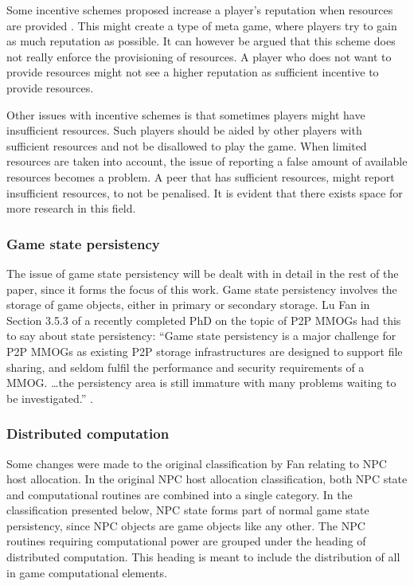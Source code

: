 \documentclass[10pt,a4paper,journal,cspaper,compsoc]{IEEEtran}
\begin{document}
Some incentive schemes proposed increase a player's reputation when resources are provided \cite{classic_p2p_reputation} \cite{proactive_reputation}.
This might create a type of meta game, where players try to gain as much reputation as possible. It can however be argued that this scheme does not
really enforce the provisioning of resources. A player who does not want to provide resources might not see a higher reputation as sufficient
incentive to provide resources.

Other issues with incentive schemes is that sometimes players might have insufficient resources. Such players should be aided by other players with
sufficient resources and not be disallowed to play the game. When limited resources are taken into account, the issue of reporting a false amount of
available resources becomes a problem. A peer that has sufficient resources, might report insufficient resources, to not be penalised. It is evident
that there exists space for more research in this field.

\subsubsection{Game state persistency}

The issue of game state persistency will be dealt with in detail in the rest of the paper, since it forms the focus of this work. Game state
persistency involves the storage of game objects, either in primary or secondary storage. Lu Fan in Section 3.5.3 of a recently completed PhD on the
topic of P2P MMOGs had this to say about state persistency: ``Game state persistency is a major challenge for P2P MMOGs as existing P2P storage
infrastructures are designed to support file sharing, and seldom fulfil the performance and security requirements of a MMOG. \ldots the persistency
area is still immature with many problems waiting to be investigated.'' \cite{Fan_phd}.

\subsubsection{Distributed computation}

Some changes were made to the original classification by Fan relating to NPC host allocation. In the original NPC host allocation classification,
both NPC state and computational routines are combined into a single category. In the classification presented below, NPC state forms part of normal
game state persistency, since NPC objects are game objects like any other. The NPC routines requiring computational power are grouped under the
heading of distributed computation. This heading is meant to include the distribution of all in game computational elements.
\end{document}
